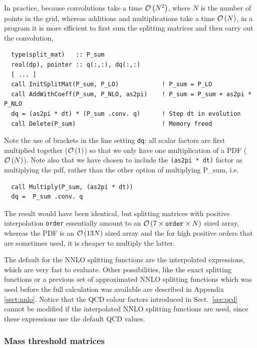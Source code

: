 \documentclass[12pt]{article}
\newcommand{\ie}{i.e.\ }
\newcommand{\ttt}[1]{\texttt{#1}}
\newcommand{\order}[1]{{\cal O}\left(#1\right)}
\begin{document}
In practice, because convolutions take a time $\order{N^2}$, where
$N$ is the number of points in the grid, whereas
additions and multiplications take a time $\order{N}$, in a program it
is more efficient to first sum the splitting matrices and then carry out the
convolution,
\begin{lstlisting}
  type(split_mat)   :: P_sum
  real(dp), pointer :: q(:,:), dq(:,:)
  [ ... ]
  call InitSplitMat(P_sum, P_LO)            ! P_sum = P_LO
  call AddWithCoeff(P_sum, P_NLO, as2pi)    ! P_sum = P_sum + as2pi * P_NLO
  dq = (as2pi * dt) * (P_sum .conv. q)      ! Step dt in evolution
  call Delete(P_sum)                        ! Memory freed
\end{lstlisting}
Note the use of brackets in the line setting \ttt{dq}: all scalar
factors are first multiplied together ($\order{1}$) so that we only
have one multiplication of a PDF ($\order{N}$). Note also that we have
chosen to include the \ttt{(as2pi * dt)} factor as multiplying the
pdf, rather than the other option of multiplying {P\_sum}, \ie 
\begin{lstlisting}
  call Multiply(P_sum, (as2pi * dt))
  dq =  P_sum .conv. q
\end{lstlisting}
The result would have been identical, but splitting matrices with
positive interpolation \ttt{order} essentially amount to an
$\order{7\times \ttt{order} \times N}$ sized array, whereas the PDF is
an $\order{13 N}$ sized array and the for high positive orders that
are sometimes used, it is cheaper to multiply the latter. 

The default for the NNLO splitting functions are the interpolated
expressions, which are very fast
to evaluate. Other possibilities, like
the exact splitting functions or a previous set of approximated NNLO
splitting functions which was used before the full
calculation was available are described in Appendix \ref{sect:nnlo}.
Notice that the QCD colour factors introduced in Sect.~\ref{sec:qcd}
cannot be modified if the interpolated NNLO splitting functions
are used, since these expressions use the default QCD values.





\subsubsection{Mass threshold matrices}
\label{sec:mtm}
\end{document}
